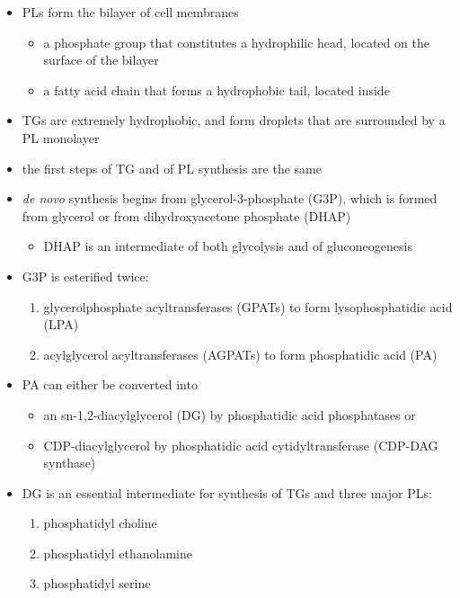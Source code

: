 \documentclass{scrartcl}
\begin{document}
\begin{itemize}
\begin{enumerate}
\begin{enumerate}
\begin{enumerate}
\begin{itemize}
\begin{enumerate}
\begin{enumerate}
\begin{itemize}
\item PLs form the bilayer of cell membranes
\begin{itemize}
\item a phosphate group that constitutes a hydrophilic head, located on the surface of the bilayer
\item a fatty acid chain that forms a hydrophobic tail, located inside
\end{itemize}
\item TGs are extremely hydrophobic, and form droplets
that are surrounded by a PL monolayer
\item the first steps of TG and of PL synthesis are the same
\item \emph{de novo} synthesis begins from glycerol-3-phosphate (G3P), which is
formed from glycerol or from dihydroxyacetone phosphate (DHAP)
\begin{itemize}
\item DHAP is an intermediate of both glycolysis and of gluconeogenesis
\end{itemize}
\item G3P is esterified twice:
\begin{enumerate}
\item glycerolphosphate acyltransferases (GPATs) to form lysophosphatidic acid (LPA)
\item acylglycerol acyltransferases (AGPATs) to form phosphatidic acid (PA)
\end{enumerate}
\item PA can either be converted into
\begin{itemize}
\item an sn-1,2-diacylglycerol (DG) by phosphatidic acid phosphatases or
\item CDP-diacylglycerol by phosphatidic acid cytidyltransferase (CDP-DAG synthase)
\end{itemize}
\item DG is an essential intermediate for synthesis of TGs and three major PLs:
\begin{enumerate}
\item phosphatidyl choline
\item phosphatidyl ethanolamine
\item phosphatidyl serine
\end{enumerate}
\end{itemize}


\end{enumerate}
\end{enumerate}
\end{itemize}
\end{enumerate}
\end{enumerate}
\end{enumerate}
\end{itemize}
\end{document}
